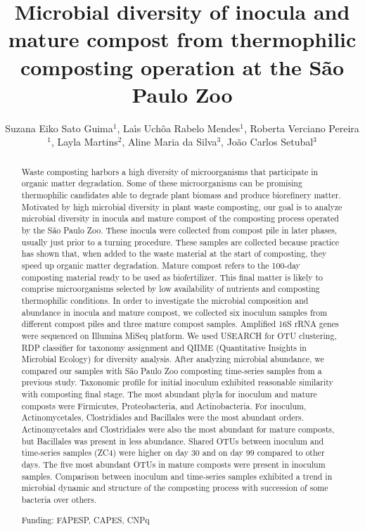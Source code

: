 \documentclass[twoside]{article}
\title{\vspace{-15mm}\fontsize{24pt}{10pt}\selectfont\textbf{Microbial diversity of inocula and mature compost from thermophilic composting operation at the S\~ao Paulo Zoo}} %
\author{Suzana Eiko Sato Guima$^1$, La\'{\i}s Uch\^oa Rabelo Mendes$^1$, Roberta Verciano Pereira$^1$, Layla Martins$^2$, Aline Maria da Silva$^3$, Jo\~ao Carlos Setubal$^3$}
\affil{1 USP\\ }
\date{}
\begin{document}
\maketitle %

\thispagestyle{fancy} %


\begin{abstract}
Waste composting harbors a high diversity of microorganisms that participate in organic matter degradation. Some of these microorganisms can be promising thermophilic candidates able to degrade plant biomass and produce biorefinery matter. Motivated by high microbial diversity in plant waste composting, our goal is to analyze microbial diversity in inocula and mature compost of the composting process operated by the S\~ao Paulo Zoo. These inocula were collected from compost pile in later phases, usually just prior to a turning procedure. These samples are collected because practice has shown that, when added to the waste material at the start of composting, they speed up organic matter degradation. Mature compost refers to the 100-day composting material ready to be used as biofertilizer. This final matter is likely to comprise microorganisms selected by low availability of nutrients and composting thermophilic conditions. In order to investigate the microbial composition and abundance in inocula and mature compost, we collected six inoculum samples from different compost piles and three mature compost samples. Amplified 16S rRNA genes were sequenced on Illumina MiSeq platform. We used USEARCH for OTU clustering, RDP classifier for taxonomy assignment and QIIME (Quantitative Insights in Microbial Ecology) for diversity analysis. After analyzing microbial abundance, we compared our samples with S\~ao Paulo Zoo composting time-series samples from a previous study. Taxonomic profile for initial inoculum exhibited reasonable similarity with composting final stage. The most abundant phyla for inoculum and mature composts were Firmicutes, Proteobacteria, and Actinobacteria. For inoculum, Actinomycetales, Clostridiales and Bacillales were the most abundant orders. Actinomycetales and Clostridiales were also the most abundant for mature composts, but Bacillales was present in less abundance. Shared OTUs between inoculum and time-series samples (ZC4) were higher on day 30 and on day 99 compared to other days. The five most abundant OTUs in mature composts were present in inoculum samples. Comparison between inoculum and time-series samples exhibited a trend in microbial dynamic and structure of the composting process with succession of some bacteria over others.

Funding: FAPESP, CAPES, CNPq
\end{abstract}
\end{document}
